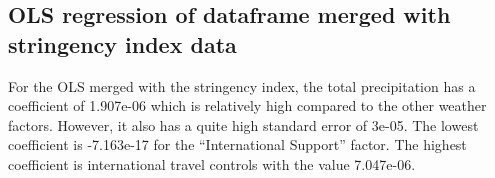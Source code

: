 \subsection{OLS regression of dataframe merged with stringency index data}
For the OLS merged with the stringency index, the total precipitation has a coefficient of 1.907e-06 which is relatively high compared to the other weather factors. However, it also has a quite high standard error of 3e-05. The lowest coefficient is -7.163e-17 for the “International Support” factor. The highest coefficient is international travel controls with the value 7.047e-06.